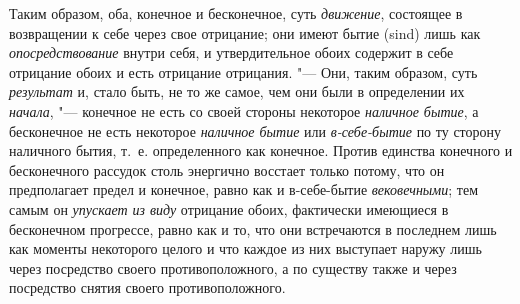Таким образом, оба, конечное и бесконечное, суть
{\em движение}, состоящее в возвращении к себе через
свое отрицание; они имеют бытие (sind) лишь как
{\em опосредствование} внутри себя, и утвердительное
обоих содержит в себе отрицание обоих и есть отрицание отрицания. "--- Они,
таким образом, суть {\em результат} и, стало быть, не
то же самое, чем они были в определении их
{\em начала}, "--- конечное не есть со своей стороны
некоторое {\em наличное бытие}, а бесконечное не есть
некоторое {\em наличное бытие} или
{\em в-себе-бытие} по ту сторону наличного бытия, т.~е.
определенного как конечное. Против единства конечного и бесконечного
рассудок столь энергично восстает только потому, что он предполагает предел
и конечное, равно как и в-себе-бытие {\em вековечными};
тем самым он {\em упускает из виду} отрицание обоих,
фактически имеющиеся в бесконечном прогрессе, равно как и то, что они
встречаются в последнем лишь как моменты некоторого целого и что каждое из
них выступает наружу лишь через посредство своего противоположного, а по
существу также и через посредство снятия своего противоположного.

